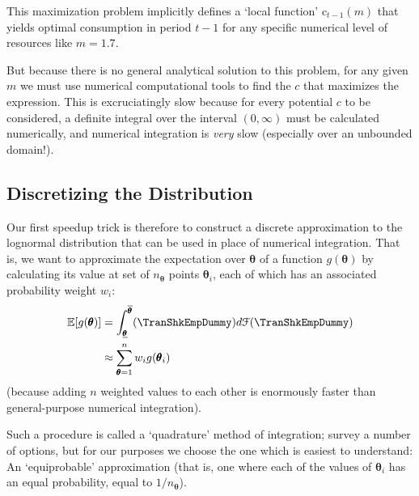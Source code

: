 \documentclass[titlepage, headings=optiontotocandhead]{Resources/texmf-local/tex/latex/econtex}
\begin{document}
\lstset{basicstyle=\ttfamily\footnotesize,breaklines=true,language=Python,frame=single}


This maximization problem implicitly defines a `local function' $\mathrm{c}_{t-1}(m)$ that yields optimal consumption in period $t-1$ for any specific numerical level of resources like $m=1.7$.%

But because there is no general analytical solution to this problem, for any given $m$ we must use numerical computational tools to find the $c$ that maximizes the expression.  This is excruciatingly slow because for every potential $c$ to be considered, a definite integral over the interval $(0,\infty)$ must be calculated numerically, and numerical integration is \textit{very} slow (especially over an unbounded domain!).

\hypertarget{discretizing-the-distribution}{}
\subsection{Discretizing the Distribution}
Our first speedup trick is therefore to construct a discrete approximation to the lognormal distribution that can be used in place of numerical integration.  That is, we want to approximate the expectation over $\pmb{\theta}$ of a function $g(\pmb{\theta})$ by calculating its value at set of $n_{\pmb{\theta}}$ points $\pmb{\theta}_{i}$, each of which has an associated probability weight $w_{i}$:
\begin{equation*}\begin{gathered}\begin{aligned}
      {\mathbb{E}}[g(\pmb{\theta})] & = \int_{\underline{\pmb{\theta}}}^{\overline{\pmb{\theta}}}(\TranShkEmpDummy)d\mathcal{F}(\TranShkEmpDummy) \\
      & \approx \sum_{\pmb{\theta} = 1}^{n}w_{i}g(\pmb{\theta}_{i})
    \end{aligned}\end{gathered}\end{equation*}
(because adding $n$ weighted values to each other is enormously faster than general-purpose numerical integration).

Such a procedure is called a `quadrature' method of integration; \cite{Tanaka2013-bc} survey a number of options, but for our purposes we choose the one which is easiest to understand: An `equiprobable' approximation (that is, one where each of the values of $\pmb{\theta}_{i}$ has an equal probability, equal to $1/n_{\pmb{\theta}}$).
\end{document}

